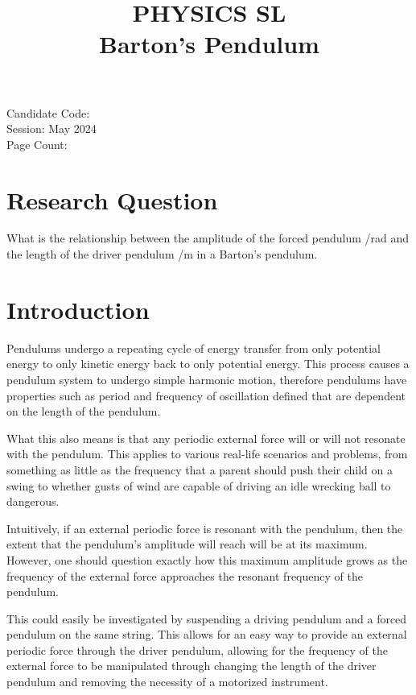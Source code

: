 \documentclass[letterpaper, 12pt]{article}
\title{PHYSICS SL
\\
Barton's Pendulum}
\author{}
\date{}
\begin{document}
\nocite{*}

\maketitle
\begin{center}
    Candidate Code:
    \\
    Session: May 2024
    \\
    Page Count:
\end{center}
\newpage

\tableofcontents
\newpage

\section{Research Question}

What is the relationship between the amplitude of
the forced pendulum /\unit{rad} and the
length of the driver pendulum /\unit{m} in a Barton's pendulum.

\section{Introduction}

Pendulums undergo a repeating cycle of energy transfer from
only potential energy to only kinetic energy back to
only potential energy. This process causes
a pendulum system to undergo simple harmonic motion,
therefore pendulums have properties such as
period and frequency of oscillation defined
that are dependent on the length of the pendulum.

What this also means is that any periodic
external force will or will not resonate with
the pendulum. This applies to various real-life
scenarios and problems, from something as little
as the frequency that a parent should push
their child on a swing to whether gusts
of wind are capable of driving an idle wrecking ball
to dangerous.

Intuitively, if an external periodic force
is resonant with the pendulum, then the extent
that the pendulum's amplitude will reach
will be at its maximum. However, one should question exactly
how this maximum amplitude grows as the frequency
of the external force approaches the resonant frequency
of the pendulum.

This could easily be investigated by suspending
a driving pendulum and a forced pendulum on
the same string. This allows for an easy way
to provide an external periodic force through
the driver pendulum, allowing for the frequency
of the external force to be manipulated through
changing the length of the driver pendulum and
removing the necessity of a motorized
instrument.
\end{document}
